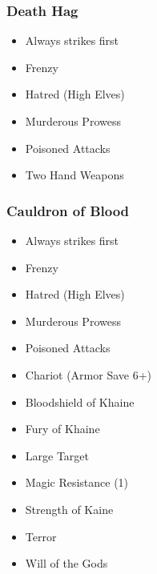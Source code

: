 \vspace{1em}
\begin{minipage}[t]{0.4\textwidth}
\subsubsection*{Death Hag}
\begin{itemize}[noitemsep,nolistsep]
\item Always strikes first\hyperref[rule:alwaysstrikesfirst]{\dragon}
\item Frenzy\hyperref[rule:frenzy]{\dragon}
\item Hatred\hyperref[rule:hatred]{\dragon} (High Elves)
\item Murderous Prowess\hyperref[rule:murderousprowness]{\dragon}
\item Poisoned Attacks\hyperref[rule:poisonedattacks]{\dragon}
\item Two Hand Weapons\hyperref[rule:twohandweapons]{\dragon}
\end{itemize}
\end{minipage}
\begin{minipage}[t]{0.6\textwidth}
\subsubsection*{Cauldron of Blood}
\begin{itemize}[noitemsep,nolistsep]
\item Always strikes first\hyperref[rule:alwaysstrikesfirst]{\dragon}
\item Frenzy\hyperref[rule:frenzy]{\dragon}
\item Hatred\hyperref[rule:hatred]{\dragon} (High Elves)
\item Murderous Prowess\hyperref[rule:murderousprowness]{\dragon}
\item Poisoned Attacks\hyperref[rule:poisonedattacks]{\dragon}
\item Chariot (Armor Save 6+)
\item Bloodshield of Khaine\hyperref[rule:bloodshield]{\dragon}
\item Fury of Khaine\hyperref[rule:furyofkhaine]{\dragon}
\item Large Target\hyperref[rule:largetarget]{\dragon}
\item Magic Resistance (1)\hyperref[rule:magicresistance]{\dragon}
\item Strength of Kaine\hyperref[rule:strengthofkhaine]{\dragon}
\item Terror\hyperref[rule:terror]{\dragon}
\item Will of the Gods\hyperref[rule:willofgods]{\dragon}
\end{itemize}
\end{minipage}

